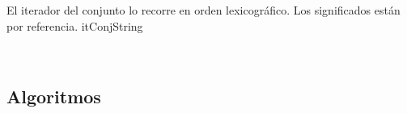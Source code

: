   El iterador del conjunto lo recorre en orden lexicográfico. Los significados están por referencia.
itConjString


  

  ~




\subsection{Algoritmos}

